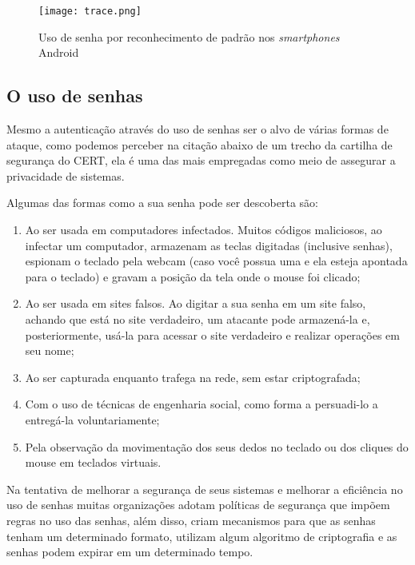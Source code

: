 \begin{figure}[!htb]
	\centering
	\texttt{[image: trace.png]} %
	\small
	\caption[Uso de senha por reconhecimento de padrão]{Uso de senha por reconhecimento de padrão nos \textit{smartphones} Android}
	\label{fig:trace}
\end{figure}

\subsection{O uso de senhas}
Mesmo a autenticação através do uso de senhas ser o alvo de várias formas de ataque, como podemos perceber na citação abaixo de um trecho da cartilha de segurança do CERT, ela é uma das mais empregadas como meio de assegurar a privacidade de sistemas.
\begin{citacao}
Algumas das formas como a sua senha pode ser descoberta são:
	\begin{enumerate}
		\item Ao ser usada em computadores infectados. Muitos códigos maliciosos, ao infectar um computador, armazenam as teclas digitadas (inclusive senhas), espionam o teclado pela webcam (caso você possua uma e ela esteja apontada para o teclado) e gravam a posição da tela onde o mouse foi clicado;
		\item Ao ser usada em sites falsos. Ao digitar a sua senha em um site falso, achando que está no site verdadeiro, um atacante pode armazená-la e, posteriormente, usá-la para acessar o site verdadeiro e realizar operações em seu nome;
		\item Ao ser capturada enquanto trafega na rede, sem estar criptografada;
		\item Com o uso de técnicas de engenharia social, como forma a persuadi-lo a entregá-la voluntariamente;
		\item Pela observação da movimentação dos seus dedos no teclado ou dos cliques do mouse em teclados virtuais.
		\cite{Cert2016}
	\end{enumerate}
\end{citacao}

Na tentativa de melhorar a segurança de seus sistemas e melhorar a eficiência no uso de senhas muitas organizações adotam políticas de segurança que impõem regras no uso das senhas, além disso, criam mecanismos para que as senhas tenham um determinado formato, utilizam algum algoritmo de criptografia e as senhas podem expirar em um determinado tempo.

